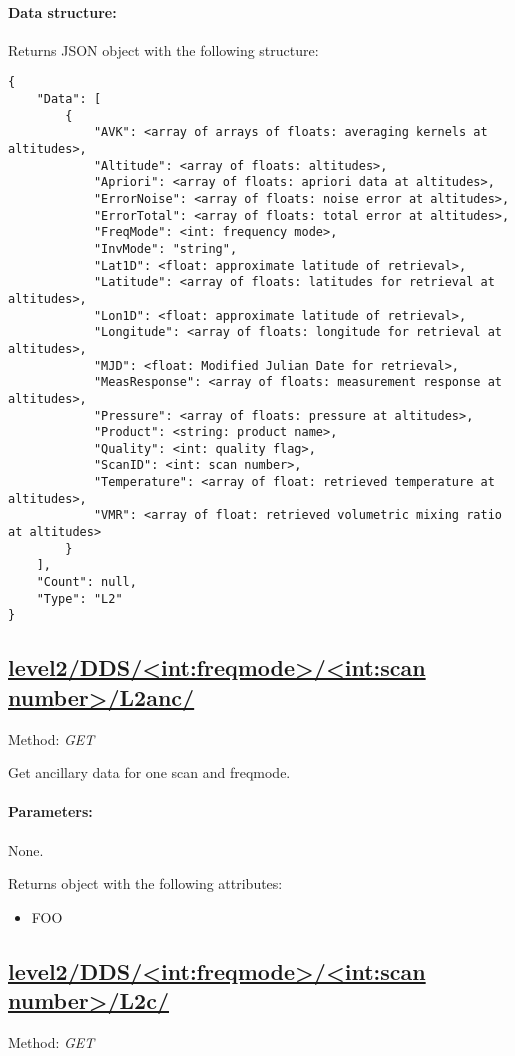 \paragraph{Data structure:}
Returns JSON object with the following structure:

\begin{lstlisting}
{
	"Data": [
		{
			"AVK": <array of arrays of floats: averaging kernels at altitudes>,
			"Altitude": <array of floats: altitudes>,
			"Apriori": <array of floats: apriori data at altitudes>,
			"ErrorNoise": <array of floats: noise error at altitudes>,
			"ErrorTotal": <array of floats: total error at altitudes>,
			"FreqMode": <int: frequency mode>,
			"InvMode": "string",
			"Lat1D": <float: approximate latitude of retrieval>,
			"Latitude": <array of floats: latitudes for retrieval at altitudes>,
			"Lon1D": <float: approximate latitude of retrieval>,
			"Longitude": <array of floats: longitude for retrieval at altitudes>,
			"MJD": <float: Modified Julian Date for retrieval>,
			"MeasResponse": <array of floats: measurement response at altitudes>,
			"Pressure": <array of floats: pressure at altitudes>,
			"Product": <string: product name>,
			"Quality": <int: quality flag>,
			"ScanID": <int: scan number>,
			"Temperature": <array of float: retrieved temperature at altitudes>,
			"VMR": <array of float: retrieved volumetric mixing ratio at altitudes>
		}
	],
	"Count": null,
	"Type": "L2"
}
\end{lstlisting}


\subsection{\url{level2/DDS/<int:freqmode>/<int:scan number>/L2anc/}}
Method: \emph{GET}

Get ancillary data for one scan and freqmode.

\paragraph{Parameters:} None.

Returns object with the following attributes:
\begin{itemize}
    \item FOO
\end{itemize}


\subsection{\url{level2/DDS/<int:freqmode>/<int:scan number>/L2c/}}
Method: \emph{GET}

